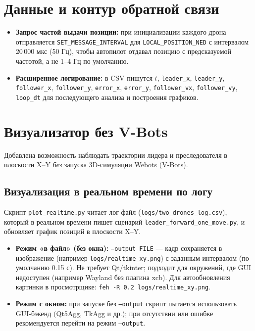 \documentclass[12pt,a4paper]{article}
\begin{document}
\section{Данные и контур обратной связи}

\begin{itemize}[noitemsep]
  \item \textbf{Запрос частой выдачи позиции:} при инициализации каждого дрона отправляется \texttt{SET\_MESSAGE\_INTERVAL} для \texttt{LOCAL\_POSITION\_NED} с интервалом 20\,000 мкс (50 Гц), чтобы автопилот отдавал позицию с предсказуемой частотой, а не 1--4 Гц по умолчанию.
  \item \textbf{Расширенное логирование:} в CSV пишутся $t$, \texttt{leader\_x}, \texttt{leader\_y}, \texttt{follower\_x}, \texttt{follower\_y}, \texttt{error\_x}, \texttt{error\_y}, \texttt{follower\_vx}, \texttt{follower\_vy}, \texttt{loop\_dt} для последующего анализа и построения графиков.
\end{itemize}

\section{Визуализатор без V-Bots}

Добавлена возможность наблюдать траектории лидера и преследователя в плоскости X--Y \emph{без} запуска 3D-симуляции Webots (V-Bots).

\subsection{Визуализация в реальном времени по логу}

Скрипт \texttt{plot\_realtime.py} читает лог-файл (\texttt{logs/two\_drones\_log.csv}), который в реальном времени пишет сценарий \texttt{leader\_forward\_one\_move.py}, и обновляет график позиций в плоскости X--Y.

\begin{itemize}[noitemsep]
  \item \textbf{Режим «в файл» (без окна):} \texttt{--output FILE} --- кадр сохраняется в изображение (например \texttt{logs/realtime\_xy.png}) с заданным интервалом (по умолчанию 0.15 с). Не требует Qt/tkinter; подходит для окружений, где GUI недоступен (например Wayland без плагина xcb). Для автообновления картинки в просмотрщике: \texttt{feh -R 0.2 logs/realtime\_xy.png}.
  \item \textbf{Режим с окном:} при запуске без \texttt{--output} скрипт пытается использовать GUI-бэкенд (Qt5Agg, TkAgg и др.); при отсутствии или ошибке рекомендуется перейти на режим \texttt{--output}.
\end{itemize}
\end{document}
